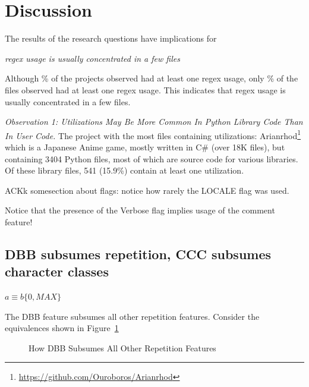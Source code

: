 \section{Discussion}
\label{sec:discussion}

The results of the research questions have implications for 


\emph{regex usage is usually concentrated in a few files}

Although \% of the projects observed had at least one regex usage, only \% of the files observed had at least one regex usage.  This indicates that regex usage is usually concentrated in a few files.  

\noindent \emph{Observation 1: Utilizations May Be More Common In Python Library Code Than In User Code. }
The project with the most files containing utilizations: Arianrhod\footnote{\url{https://github.com/Ouroboros/Arianrhod}} which is a Japanese Anime game, mostly written in C\# (over 18K files), but containing 3404 Python files, most of which are source code for various libraries.  Of these library files, 541 (15.9\%) contain at least one utilization. 


ACKk somesection about flags: notice how rarely the LOCALE flag was used.

Notice that the presence of the Verbose flag implies usage of the comment feature!





\subsection{DBB subsumes repetition, CCC subsumes character classes}




$a \equiv b \{0, MAX\}$


The DBB feature subsumes all other repetition features.  Consider the equivalences shown in Figure~\ref{fig:DBBequivalences}

\begin{figure}[tb]
\centering
{}
\caption{How DBB Subsumes All Other Repetition Features}
\label{fig:DBBequivalences}
\end{figure}

